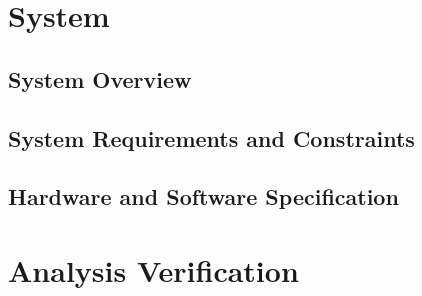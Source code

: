 \documentclass[12pt, letterpaper]{report}
\begin{document}
\section{System}
\subsection{System Overview}
\subsection{System Requirements and Constraints}
\subsection{Hardware and Software Specification}

\section{Analysis Verification}
\end{document}
